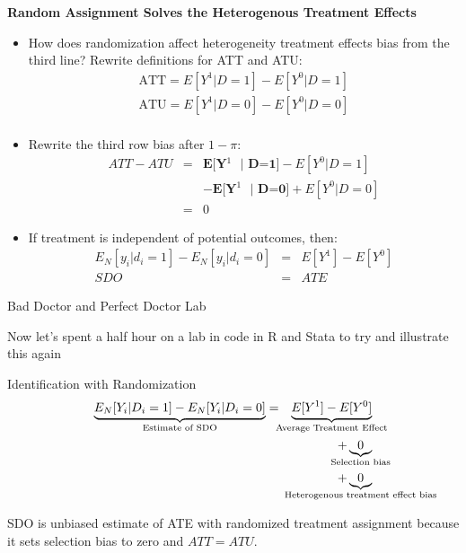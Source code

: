 \documentclass{beamer}
\begin{document}
\begin{frame}[shrink=20,plain]
  \begin{center}
    \textbf{Random Assignment Solves the Heterogenous Treatment Effects}
  \end{center}

  \begin{itemize}
    \item How does randomization affect heterogeneity treatment effects bias from the third line?  Rewrite definitions for ATT and ATU:\begin{eqnarray*}
            \text{ATT} = E[Y^1 | D=1] - E[Y^0 | D=1] \\
            \text{ATU} = E[Y^1 | D=0] - E[Y^0 | D=0] \\
          \end{eqnarray*}
    \item Rewrite the third row bias after $1-\pi$:\begin{eqnarray*}
            ATT - ATU &=& \textbf{E[Y$^1$ $|$ D=1]} - E[Y^0 | D=1] \\
            && - \textbf{E[Y$^1$ $|$ D=0]} + E[Y^0 | D=0] \\
            &=& 0
          \end{eqnarray*}
    \item If treatment is independent of potential outcomes, then:\begin{eqnarray*}
            E_N[y_i | d_i=1] - E_N[y_i | d_i=0]  &=& E[Y^1] - E[Y^0] \\
            SDO &=& ATE
          \end{eqnarray*}
  \end{itemize}
\end{frame}


\begin{frame}{Bad Doctor and Perfect Doctor Lab}

Now let's spent a half hour on a lab in code in R and Stata to try and illustrate this again

\end{frame}

\begin{frame}[plain]

  \begin{block}{Identification with Randomization}
    \begin{eqnarray*}
      \underbrace{E_N[Y_i | D_i=1] - E_N[Y_i | D_i=0]}_{ \mathclap{\text{Estimate of SDO}}}&=& \underbrace{E[Y^1] - E[Y^0]}_{ \mathclap{\text{Average Treatment Effect}}} \\
    &&+ \underbrace{0}_{ \mathclap{\text{Selection bias}}}  \\
    && + \underbrace{0}_{ \mathclap{\text{Heterogenous treatment effect bias}}}
    \end{eqnarray*}
  \end{block}
  
  SDO is unbiased estimate of ATE with randomized treatment assignment because it sets selection bias to zero and $ATT=ATU$.



\end{frame}
\end{document}
